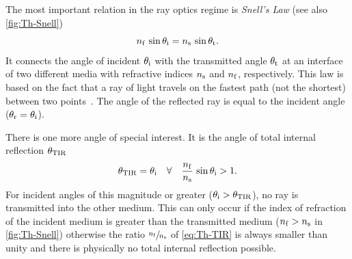 The most important relation in the ray optics regime is \emph{Snell's Law} (see 
also \cref{fig:Th-Snell})
\begin{equation}
  n_{\mathrm{f}}\,\sin\theta_{\mathrm{i}} = n_{\mathrm{s}}\,\sin\theta_{\mathrm{t}}.
  \label{eq:Th-Snell}
\end{equation}
It connects the angle of incident $\theta_{\mathrm{i}}$ with the transmitted angle 
$\theta_{\mathrm{t}}$ at an interface of two different media with refractive indices 
$n_{\mathrm{s}}$ and $n_{\mathrm{f}}$, respectively. This law is based on the fact that a ray of 
light travels on the fastest path (not the shortest) between two 
points~\cite{Born1980Ch3}. The angle of the reflected ray is equal to the 
incident angle ($\theta_{\mathrm{r}}=\theta_{\mathrm{i}}$).

There is one more angle of special interest. It is the angle of total internal 
reflection $\theta_{\mathrm{TIR}}$
\begin{equation}
  \theta_{\mathrm{TIR}}=\theta_{\mathrm{i}} \quad\forall\quad \frac{n_{\mathrm{f}}}{n_{\mathrm{s}}}\,\sin\theta_{\mathrm{i}} 
  > 1.
  \label{eq:Th-TIR}
\end{equation}
For incident angles of this magnitude or greater 
($\theta_{\mathrm{i}}>\theta_{\mathrm{TIR}}$), no ray is transmitted into the other medium. 
This can only occur if the index of refraction of the incident medium is 
greater than the transmitted medium ($n_{\mathrm{f}}>n_{\mathrm{s}}$ in \cref{fig:Th-Snell}) 
otherwise the ratio $\sfrac{n_{\mathrm{f}}}{n_{\mathrm{s}}}$ of \cref{eq:Th-TIR} is always smaller 
than unity and there is physically no total internal reflection possible.


